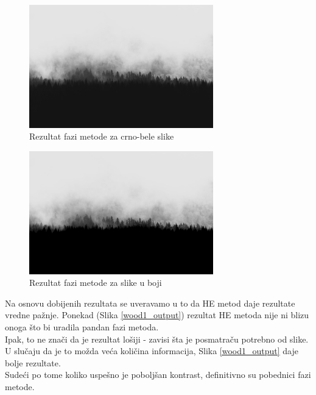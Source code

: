 \documentclass[12pt,a4paper]{article}
\theoremstyle{definition}
\theoremstyle{remark}
\theoremstyle{plain}
\begin{document}
\begin{multicols}{2}
\begin{figure}[H]
\centering
\includegraphics[width=8cm]{images/fuzzy_grayscale_1.jpg}
  \caption{Rezultat fazi metode za crno-bele slike}\label{river1}
\end{figure}
\columnbreak
\begin{figure}[H]
\centering
\includegraphics[width=8cm]{images/fuzzy_color_4.jpg}
  \caption{Rezultat fazi metode za slike u boji}\label{river_output1}
\end{figure}
\end{multicols}

Na osnovu dobijenih rezultata se uveravamo u to da HE metod daje rezultate vredne pa\v znje. Ponekad (Slika \ref{wood1_output}) rezultat HE metoda nije ni blizu onoga
\v sto bi uradila pandan fazi metoda. \\
Ipak, to ne zna\v ci da je rezultat lo\v siji - zavisi \v sta je posmatra\v cu potrebno od slike. U slu\v caju da je to mo\v zda ve\' ca koli\v cina informacija,
Slika \ref{wood1_output} daje bolje rezultate. \\ 
Sude\' ci po tome koliko uspe\v sno je pobolj\v san kontrast, definitivno su pobednici fazi metode.

\newpage
\end{document}
